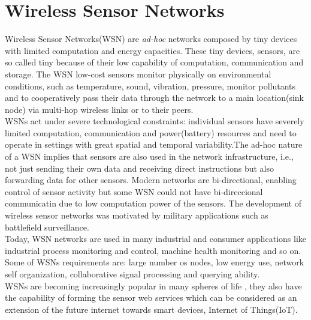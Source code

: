 \chapter{Wireless Sensor Networks}\label{chap:wsn}
Wireless Sensor Networks(WSN) are \textit{ad-hoc} networks composed by tiny devices with limited computation and energy capacities. These tiny devices, sensors, are so called tiny because of their low capability of computation, communication and storage. The WSN  low-cost sensors monitor physically on environmental conditions, such as temperature, sound, vibration, pressure, monitor pollutants and to cooperatively pass their data through the network to a main location(sink node) via multi-hop wireless links\cite{asad2013survey} or to their peers.\\ 
WSNs act under severe technological constraints: individual sensors have severely limited computation, communication and power(battery) resources and need to operate in settings with great spatial and temporal variability.The ad-hoc nature of a WSN implies that sensors are also used in the network infrastructure, i.e., not just sending their own data and receiving direct instructions but also forwarding data for other sensors. Modern networks are bi-directional, enabling control of sensor activity but some WSN could not have bi-direccional communicatin  due to low computation power of the sensors. The development of wireless sensor networks was motivated by military applications such as battlefield surveillance.\\
Today, WSN networks are used in many industrial and consumer applications like industrial process monitoring and control, machine health monitoring and so on. Some of WSNs requirements are:  large number os nodes, low energy use, network self organization, collaborative signal processing and querying ability.\\
 WSNs are becoming increasingly popular in many spheres of life \cite{castelluccia2005efficient}, they also have the capability of forming the sensor web services which can be considered as an extension of the future internet towards smart devices, Internet of Things(IoT)\cite{asad2013survey}.  \\


